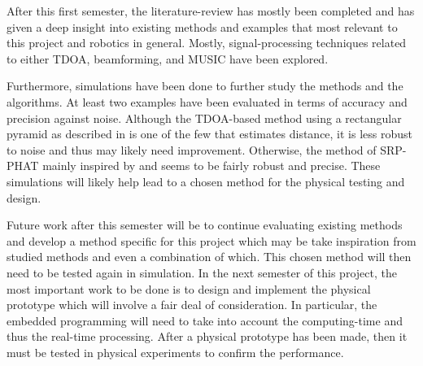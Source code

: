 \documentclass[notitlepage]{report}
\begin{document}
After this first semester, the literature-review has mostly been completed and has given a deep insight into existing methods and examples that most relevant to this project and robotics in general. Mostly, signal-processing techniques related to either TDOA, beamforming, and MUSIC have been explored.

Furthermore, simulations have been done to further study the methods and the algorithms. At least two examples have been evaluated in terms of accuracy and precision against noise. Although the TDOA-based method using a rectangular pyramid as described in \cite{chen_sound_2019} is one of the few that estimates distance, it is less robust to noise and thus may likely need improvement. Otherwise, the method of SRP-PHAT mainly inspired by \cite{valin_localization_2004} and \cite{valin_robust_2007} seems to be fairly robust and precise. These simulations will likely help lead to a chosen method for the physical testing and design.

Future work after this semester will be to continue evaluating existing methods and develop a method specific for this project which may be take inspiration from studied methods and even a combination of which. This chosen method will then need to be tested again in simulation. In the next semester of this project, the most important work to be done is to design and implement the physical prototype which will involve a fair deal of consideration. In particular, the embedded programming will need to take into account the computing-time and thus the real-time processing. After a physical prototype has been made, then it must be tested in physical experiments to confirm the performance.
\end{document}
